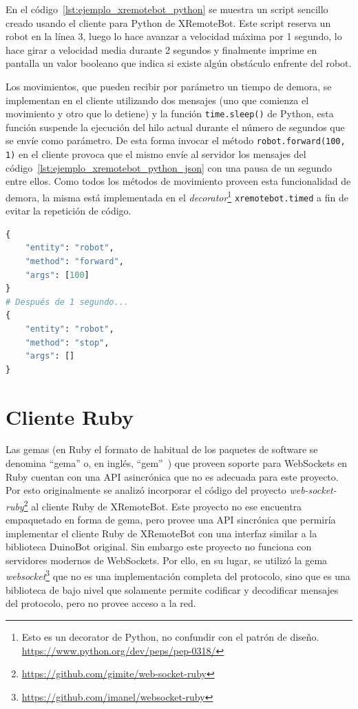 En el código~\ref{lst:ejemplo_xremotebot_python} se muestra
un script sencillo creado usando el cliente para Python de XRemoteBot. Este
script reserva un robot en la línea 3, luego lo hace avanzar
a velocidad máxima por 1 segundo, lo hace girar a velocidad media
durante 2 segundos y finalmente imprime en pantalla un valor booleano
que indica si existe algún obstáculo enfrente del robot.

Los movimientos, que pueden recibir por parámetro un tiempo de demora,
se implementan en el cliente
utilizando dos mensajes (uno que comienza el movimiento y otro que lo detiene)
y la función \texttt{time.sleep()} de Python,
esta función suspende la ejecución del hilo actual durante el número
de segundos que se envíe como parámetro. De esta
forma
invocar el método \texttt{robot.forward(100, 1)} en el cliente provoca que
el mismo envíe al servidor los mensajes del
código~\ref{lst:ejemplo_xremotebot_python_json} con una pausa de un segundo
entre ellos. Como todos los métodos de movimiento
proveen esta funcionalidad de demora, la misma está implementada en el
\textit{decorator}\footnote{Esto es un decorator de Python, no confundir
con el patrón de diseño. \url{https://www.python.org/dev/peps/pep-0318/}}
\texttt{xremotebot.timed} a fin de evitar la repetición de código.

\begin{lstlisting}[language=Python,
caption={Mensajes generados al invocar \texttt{robot.forward(100, 1)} en
XRemoteBot para Python}, label=lst:ejemplo_xremotebot_python_json]
{
    "entity": "robot",
    "method": "forward",
    "args": [100]
}
# Después de 1 segundo...
{
    "entity": "robot",
    "method": "stop",
    "args": []
}
\end{lstlisting}


\section{Cliente Ruby}\label{ch4:ruby}

Las gemas (en Ruby el formato de habitual de los paquetes de software
se denomina ``gema'' o, en inglés, ``gem''~\citep{thomas_2013})
que proveen soporte para WebSockets en Ruby cuentan con una API
asincrónica que no es adecuada para este proyecto.
Por esto originalmente se analizó incorporar el código del proyecto
\textit{web-socket-ruby}\footnote{\url{https://github.com/gimite/web-socket-ruby}}
al cliente Ruby de XRemoteBot. Este proyecto no ese encuentra empaquetado en
forma de gema, pero provee una API sincrónica que permiría implementar el
cliente Ruby de XRemoteBot
con una interfaz similar a la biblioteca DuinoBot original.
Sin embargo este proyecto no funciona
con servidores modernos de WebSockets. Por ello, en su lugar,
se utilizó la gema \textit{websocket}\footnote{\url{https://github.com/imanel/websocket-ruby}}
que no es una implementación completa
del protocolo, sino que es una biblioteca de bajo nivel que
solamente permite codificar y decodificar mensajes del protocolo, pero no provee
acceso a la red.

